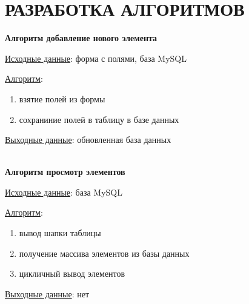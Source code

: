 \newpage

\section{РАЗРАБОТКА АЛГОРИТМОВ}


\textbf{Алгоритм добавление нового элемента}

\underline{Исходные данные}: форма с полями, база MySQL

\underline{Алгоритм}:

\begin{enumerate}
    \item взятие полей из формы
    \item сохраниние полей в таблицу в базе данных
\end{enumerate}

\underline{Выходные данные}: обновленная база данных

\hspace{0pt}\\


\textbf{Алгоритм просмотр элементов}

\underline{Исходные данные}: база MySQL

\underline{Алгоритм}:

\begin{enumerate}
    \item вывод шапки таблицы
    \item получение массива элементов из базы данных
    \item цикличный вывод элементов
\end{enumerate}

\underline{Выходные данные}: нет

\hspace{0pt}\\


\newpage